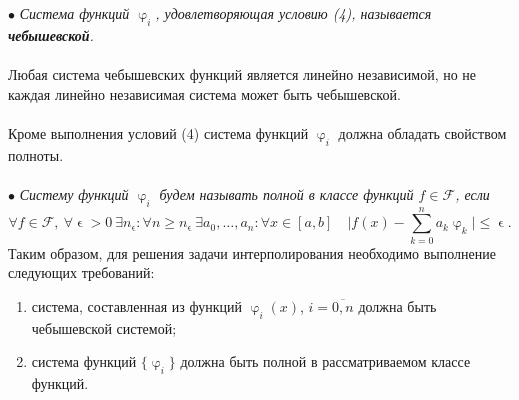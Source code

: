 \documentclass[a4paper, 12pt]{report}
\renewcommand{\leq}{\leqslant}
\renewcommand{\geq}{\geqslant}
\renewcommand{\varphi}{\upvarphi}
\renewcommand{\epsilon}{\upvarepsilon}
\begin{document}
 	 	$\bullet$ \textit{Система функций $\varphi_i$, удовлетворяющая условию (4), называется \textbf{чебышевской}.}\\\\
	Любая система чебышевских функций является линейно независимой, но не каждая линейно независимая система может быть чебышевской.\\\\
	Кроме выполнения условий (4) система функций ${\varphi_i}$ должна обладать свойством полноты.\\\\
	$\bullet$ \textit{Систему функций ${\varphi_i}$ будем называть полной в классе функций $f \in \mathcal F$, если} $$\forall f\in \mathcal F,\ \forall \epsilon > 0\ \exists n_\epsilon : \forall n \geq n_\epsilon\ \exists a_0,\ldots, a_n : \forall x \in [a,b]\quad \Big|f(x) - \sum_{k=0}^{n}a_k\varphi_k|\leq \epsilon.$$
	Таким образом, для решения задачи интерполирования необходимо выполнение следующих требований:
	\begin{enumerate}
		\item система, составленная из функций $\varphi_i(x)$, $i=\overline{0,n}$ должна быть чебышевской системой;
		\item система функций $\{\varphi_i\}$ должна быть полной в рассматриваемом классе функций.
	\end{enumerate}
\end{document}
